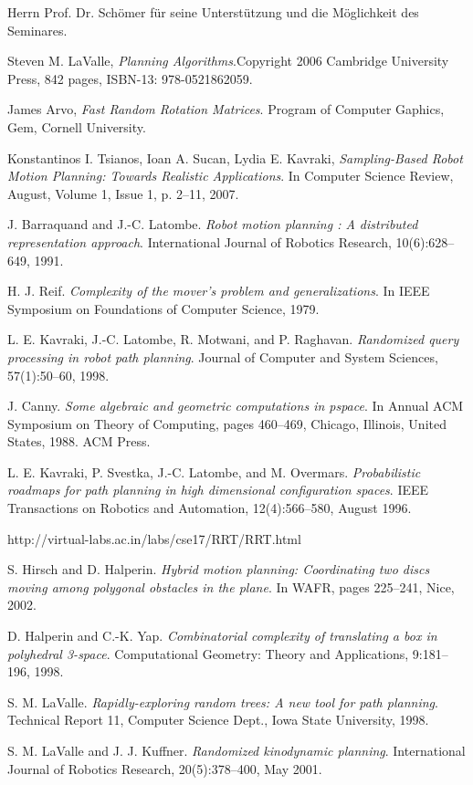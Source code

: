 \documentclass[journal]{IEEEtran}
\begin{document}
Herrn Prof. Dr. Schömer für seine Unterstützung und die Möglichkeit des Seminares.


\begin{thebibliography}{1}

Steven M. LaValle, \emph{Planning Algorithms}.Copyright 2006
   Cambridge University Press, 842 pages, ISBN-13: 978-0521862059.

 James Arvo, \emph{Fast Random Rotation Matrices}. Program of Computer Gaphics, Gem, Cornell University.

Konstantinos I. Tsianos, Ioan A. Sucan, Lydia E. Kavraki, \emph{Sampling-Based Robot Motion Planning:
Towards Realistic Applications}. In Computer Science Review, August, Volume 1, Issue 1, p. 2–11, 2007.

 J. Barraquand and J.-C. Latombe. \emph{Robot motion planning :
A distributed representation approach}. International Journal of
Robotics Research, 10(6):628–649, 1991.

 H. J. Reif.  \emph{Complexity of the mover’s problem and generalizations}.
In IEEE Symposium on Foundations of Computer Science, 1979.

 L. E. Kavraki, J.-C. Latombe, R. Motwani, and P. Raghavan.
 \emph{Randomized query processing in robot path planning}. Journal of
Computer and System Sciences, 57(1):50–60, 1998.

 J. Canny.  \emph{Some algebraic and geometric computations in pspace}. In
Annual ACM Symposium on Theory of Computing, pages 460–469,
Chicago, Illinois, United States, 1988. ACM Press.

 L. E. Kavraki, P. Svestka, J.-C. Latombe, and M. Overmars.
 \emph{Probabilistic roadmaps for path planning in high dimensional
configuration spaces}. IEEE Transactions on Robotics and
Automation, 12(4):566–580, August 1996.

 http://virtual-labs.ac.in/labs/cse17/RRT/RRT.html

 S. Hirsch and D. Halperin.  \emph{Hybrid motion planning: Coordinating
two discs moving among polygonal obstacles in the plane}. In WAFR,
pages 225–241, Nice, 2002.

 D. Halperin and C.-K. Yap.  \emph{Combinatorial complexity of translating
a box in polyhedral 3-space}. Computational Geometry: Theory and
Applications, 9:181–196, 1998.

 S. M. LaValle.  \emph{Rapidly-exploring random trees: A new tool for path
planning}. Technical Report 11, Computer Science Dept., Iowa State
University, 1998.

 S. M. LaValle and J. J. Kuffner.  \emph{Randomized kinodynamic planning}.
International Journal of Robotics Research, 20(5):378–400, May 2001.

\end{thebibliography}
\end{document}
